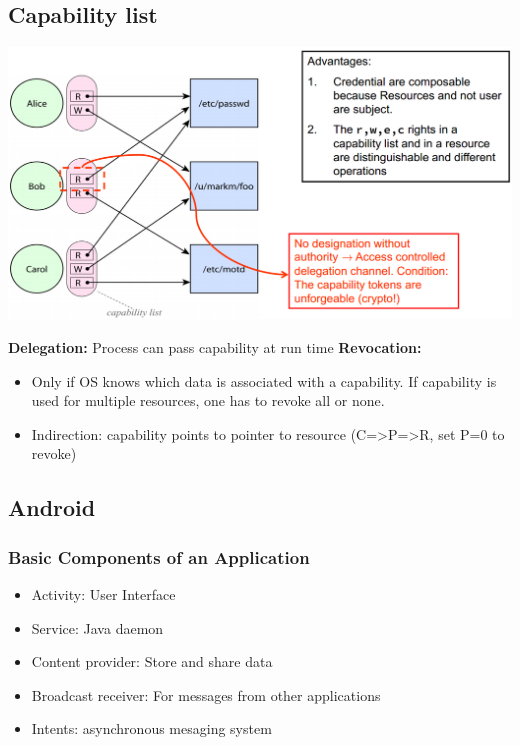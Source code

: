 \documentclass[10pt]{article}
\begin{document}
\subsection{Capability list}
\begin{center}
	\includegraphics[scale=0.4]{capability_list.png}
\end{center}
\textbf{Delegation:} Process can pass capability at run time
\textbf{Revocation:}
\begin{itemize}
	\item Only if OS knows which data is associated with a capability. If capability is used for multiple resources, one has to revoke all or none.
	\item Indirection: capability points to pointer to resource (C=>P=>R, set P=0 to revoke)
\end{itemize}
\subsection{Android}
\subsubsection{Basic Components of an Application}
\begin{itemize}
	\item Activity: User Interface
	\item Service: Java daemon
	\item Content provider: Store and share data
	\item Broadcast receiver: For messages from other applications
	\item Intents: asynchronous mesaging system
\end{itemize}
\end{document}

